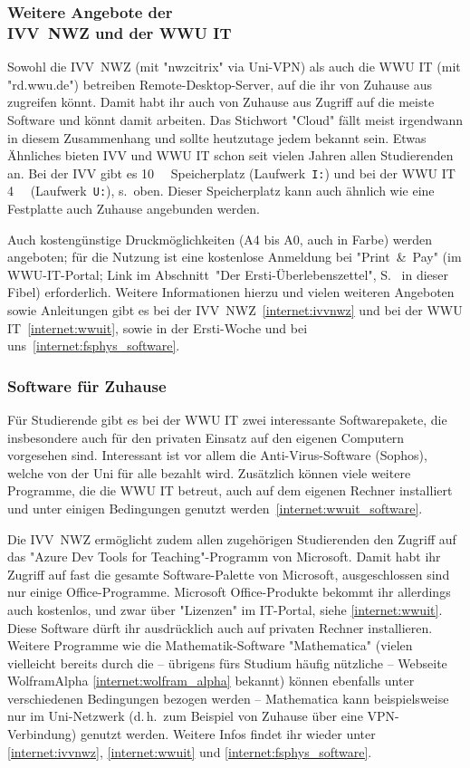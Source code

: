 \begin{multicols*}{2}
\subsubsection[Weitere Angebote der IVV~NWZ und der WWU IT]{Weitere Angebote der\\IVV~NWZ und der WWU IT}
Sowohl die IVV~NWZ (mit "nwzcitrix" via Uni-VPN) als auch die WWU IT (mit "rd.wwu.de") betreiben Remote-Desktop-Server, auf die ihr von Zuhause aus zugreifen könnt.
Damit habt ihr auch von Zuhause aus Zugriff auf die meiste Software und könnt damit arbeiten.
Das Stichwort "Cloud" fällt meist irgendwann in diesem Zusammenhang und sollte heutzutage jedem bekannt sein.
Etwas Ähnliches bieten IVV und WWU IT schon seit vielen Jahren allen Studierenden an.
Bei der IVV gibt es \SI{10}{\giga\byte} Speicherplatz (Laufwerk~\texttt{I:}) und bei der WWU IT \SI{4}{\giga\byte} (Laufwerk~\texttt{U:}), s.~oben.
Dieser Speicherplatz kann auch ähnlich wie eine Festplatte auch Zuhause angebunden werden.

Auch kostengünstige Druckmöglichkeiten (A4 bis A0, auch in Farbe) werden angeboten; für die Nutzung ist eine kostenlose Anmeldung bei "Print~\&~Pay" (im WWU-IT-Portal; Link im Abschnitt~"Der Ersti-Überlebenszettel", S.~\pageref{dpü} in dieser Fibel) erforderlich.
Weitere Informationen hierzu und vielen weiteren Angeboten sowie Anleitungen gibt es bei der IVV~NWZ~\cref{internet:ivvnwz} und bei der WWU IT~\cref{internet:wwuit}, sowie in der Ersti-Woche und bei uns~\cref{internet:fsphys_software}.

\subsubsection{Software für Zuhause}
Für Studierende gibt es bei der WWU IT zwei interessante Softwarepakete, die insbesondere auch für den privaten Einsatz auf den eigenen Computern vorgesehen sind.
Interessant ist vor allem die Anti-Virus-Software (Sophos), welche von der Uni für alle bezahlt wird.
Zusätzlich können viele weitere Programme, die die WWU IT betreut, auch auf dem eigenen Rechner installiert und unter einigen Bedingungen genutzt werden~\cref{internet:wwuit_software}.

Die IVV~NWZ ermöglicht zudem allen zugehörigen Studierenden den Zugriff auf das "Azure Dev Tools for Teaching"-Programm von Microsoft.
Damit habt ihr Zugriff auf fast die gesamte Software-Palette von Microsoft, ausgeschlossen sind nur einige Office-Programme. Microsoft Office-Produkte bekommt ihr allerdings auch kostenlos, und zwar über "Lizenzen" im IT-Portal, siehe \cref{internet:wwuit}.
Diese Software dürft ihr ausdrücklich auch auf privaten Rechner installieren.
Weitere Programme wie die Mathematik-Software "Mathematica" (vielen vielleicht bereits durch die -- übrigens fürs Studium häufig nützliche -- Webseite WolframAlpha \cref{internet:wolfram_alpha} bekannt) können ebenfalls unter verschiedenen Bedingungen bezogen werden -- Mathematica kann beispielsweise nur im Uni-Netzwerk (d.\,h.\ zum Beispiel von Zuhause über eine VPN-Verbindung) genutzt werden.
Weitere Infos findet ihr wieder unter \cref{internet:ivvnwz}, \cref{internet:wwuit} und \cref{internet:fsphys_software}.


\end{multicols*}
